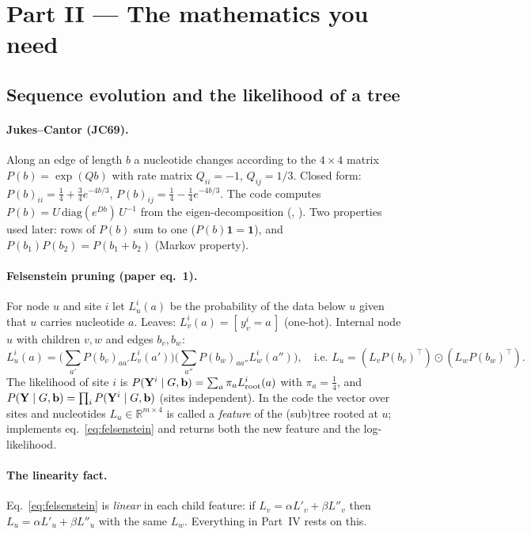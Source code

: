 \section{Part II --- The mathematics you need}

\subsection{Sequence evolution and the likelihood of a tree}
\paragraph{Jukes--Cantor (JC69).} Along an edge of length $b$ a nucleotide changes according to the $4\times4$ matrix $P(b)=\exp(Qb)$ with rate matrix $Q_{ii}=-1$, $Q_{ij}=1/3$. Closed form: $P(b)_{ii}=\tfrac14+\tfrac34e^{-4b/3}$, $P(b)_{ij}=\tfrac14-\tfrac14e^{-4b/3}$. The code computes $P(b)=U\,\mathrm{diag}(e^{Db})\,U^{-1}$ from the eigen-decomposition (, ). Two properties used later: rows of $P(b)$ sum to one ($P(b)\mathbf 1=\mathbf 1$), and $P(b_1)P(b_2)=P(b_1+b_2)$ (Markov property).

\paragraph{Felsenstein pruning (paper eq.~1).} For node $u$ and site $i$ let $L^i_u(a)$ be the probability of the data below $u$ given that $u$ carries nucleotide $a$. Leaves: $L^i_v(a)=[\,y^i_v=a\,]$ (one-hot). Internal node $u$ with children $v,w$ and edges $b_v,b_w$:
\begin{equation}\label{eq:felsenstein}
L^i_u(a)=\Big(\sum_{a'}P(b_v)_{aa'}L^i_v(a')\Big)\Big(\sum_{a''}P(b_w)_{aa''}L^i_w(a'')\Big),
\quad\text{i.e. } L_u = (L_v P(b_v)^{\!\top}\!)\odot(L_w P(b_w)^{\!\top}\!).
\end{equation}
The likelihood of site $i$ is $P(\mathbf{Y}^i\mid G,\mathbf{b})=\sum_a \pi_a L^i_{\text{root}}(a)$ with $\pi_a=\tfrac14$, and $P(\mathbf{Y}\mid G,\mathbf{b})=\prod_i P(\mathbf{Y}^i\mid G,\mathbf{b})$ (sites independent). In the code the vector over sites and nucleotides $L_u\in\mathbb R^{m\times4}$ is called a \emph{feature} of the (sub)tree rooted at $u$;  implements eq.~\eqref{eq:felsenstein} and returns both the new feature and the log-likelihood.

\paragraph{The linearity fact.} Eq.~\eqref{eq:felsenstein} is \emph{linear} in each child feature: if $L_v=\alpha L'_v+\beta L''_v$ then $L_u=\alpha L'_u+\beta L''_u$ with the same $L_w$. Everything in Part~IV rests on this.

